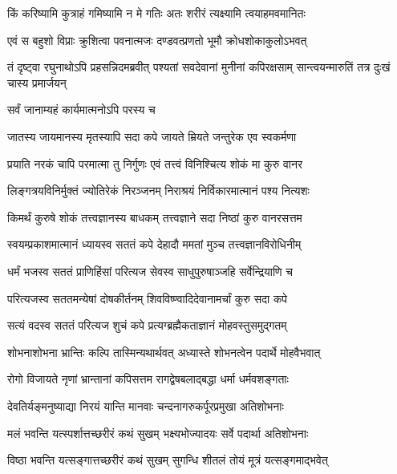 \twolineshloka
{किं करिष्यामि कुत्राहं गमिष्यामि न मे गतिः}
{अतः शरीरं त्यक्ष्यामि त्वयाहमवमानितः}%


\twolineshloka
{एवं स बहुशो विप्राः क्रुशित्वा पवनात्मजः}
{दण्डवत्प्रणतो भूमौ क्रोधशोकाकुलोऽभवत्}%

\threelineshloka
{तं दृष्ट्वा रघुनाथोऽपि प्रहसन्निदमब्रवीत्}
{पश्यतां सवदेवानां मुनीनां कपिरक्षसाम्}
{सान्त्वयन्मारुतिं तत्र दुःखं चास्य प्रमार्जयन्}%


\onelineshloka
{सर्वं जानाम्यहं कार्यमात्मनोऽपि परस्य च}%

\twolineshloka
{जातस्य जायमानस्य मृतस्यापि सदा कपे}
{जायते म्रियते जन्तुरेक एव स्वकर्मणा} %

\twolineshloka
{प्रयाति नरकं चापि परमात्मा तु निर्गुणः}
{एवं तत्त्वं विनिश्चित्य शोकं मा कुरु वानर}%

\twolineshloka
{लिङ्गत्रयविनिर्मुक्तं ज्योतिरेकं निरञ्जनम्}
{निराश्रयं निर्विकारमात्मानं पश्य नित्यशः}%

\twolineshloka
{किमर्थं कुरुषे शोकं तत्त्वज्ञानस्य बाधकम्}
{तत्त्वज्ञाने सदा निष्ठां कुरु वानरसत्तम}%

\twolineshloka
{स्वयम्प्रकाशमात्मानं ध्यायस्व सततं कपे}
{देहादौ ममतां मुञ्च तत्त्वज्ञानविरोधिनीम्}%

\twolineshloka
{धर्मं भजस्व सततं प्राणिहिंसां परित्यज}
{सेवस्व साधुपुरुषाञ्जहि सर्वेन्द्रियाणि च}%

\twolineshloka
{परित्यजस्व सततमन्येषां दोषकीर्तनम्}
{शिवविष्ण्वादिदेवानामर्चां कुरु सदा कपे}%

\twolineshloka
{सत्यं वदस्व सततं परित्यज शुचं कपे}
{प्रत्यग्ब्रह्मैकताज्ञानं मोहवस्तुसमुद्गतम्}%

\twolineshloka
{शोभनाशोभना भ्रान्तिः कल्पि तास्मिन्यथार्थवत्}
{अध्यास्ते शोभनत्वेन पदार्थे मोहवैभवात्}%

\twolineshloka
{रोगो विजायते नृणां भ्रान्तानां कपिसत्तम}
{रागद्वेषबलाद्बद्धा धर्मा धर्मवशङ्गताः}%

\twolineshloka
{देवतिर्यङ्मनुष्याद्या निरयं यान्ति मानवाः}
{चन्दनागरुकर्पूरप्रमुखा अतिशोभनाः}%

\twolineshloka
{मलं भवन्ति यत्स्पर्शात्तच्छरीरं कथं सुखम्}
{भक्ष्यभोज्यादयः सर्वे पदार्था अतिशोभनाः}%

\twolineshloka
{विष्ठा भवन्ति यत्सङ्गात्तच्छरीरं कथं सुखम्}
{सुगन्धि शीतलं तोयं मूत्रं यत्सङ्गमाद्भवेत्}%

